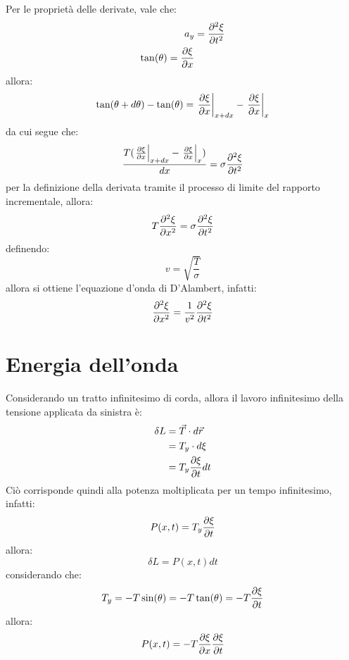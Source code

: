 \documentclass[11pt, a4paper, openright]{book}
\theoremstyle{plain}
\theoremstyle{definition}
\begin{document}
Per le proprietà delle derivate, vale che:
\begin{align}
    a_y & = \pdv[2]{\xi}{t} \\
    \tan(\theta) = \pdv{\xi}{x}
\end{align}
allora:
\begin{equation}
    \tan(\theta + d\theta) - \tan(\theta) = \eval{\pdv{\xi}{x}}_{x + dx}^{} - \eval{\pdv{\xi}{x}}_{x}^{}
\end{equation}
da cui segue che:
\begin{equation}
    \frac{T(\eval{\pdv{\xi}{x}}_{x + dx}^{} - \eval{\pdv{\xi}{x}}_{x}^{})}{dx} = \sigma \pdv[2]{\xi}{t}
\end{equation}
per la definizione della derivata tramite il processo di limite del rapporto incrementale, allora:
\begin{equation}
    T\pdv[2]{\xi}{x} = \sigma \pdv[2]{\xi}{t}
\end{equation}
definendo:
\begin{equation}
    v = \sqrt{\frac{T}{\sigma}}
\end{equation}
allora si ottiene l'equazione d'onda di D'Alambert, infatti:
\begin{equation}
    \pdv[2]{\xi}{x} = \frac{1}{v^2} \pdv[2]{\xi}{t}
\end{equation}

\section{Energia dell'onda}
Considerando un tratto infinitesimo di corda, allora il lavoro infinitesimo della tensione applicata da sinistra è:
\begin{align}
    \delta L & = \vec{T} \cdot d\vec{r} \\
             & = T_y \cdot d\xi \\
             & = T_y \pdv{\xi}{t} dt
\end{align}
Ciò corrisponde quindi alla potenza moltiplicata per un tempo infinitesimo, infatti:
\begin{equation}
    P(x, t) = T_y \pdv{\xi}{t}
\end{equation}
allora:
\begin{equation}
    \delta L = P(x, t)dt
\end{equation}
considerando che:
\begin{equation}
    T_y = -T\sin(\theta) = -T\tan(\theta) = -T \pdv{\xi}{t}
\end{equation}
allora:
\begin{equation}
    P(x, t) = - T \pdv{\xi}{x}\pdv{\xi}{t}
\end{equation}
\end{document}
